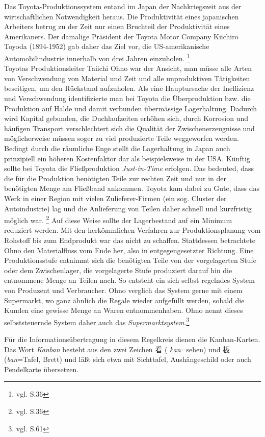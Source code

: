 Das Toyota-Produktionssystem entand im Japan der Nachkriegszeit 
aus der wirtschaftlichen Notwendigkeit heraus. 
Die Produktivität eines japanischen Arbeiters betrug zu der Zeit nur einen Bruchteil der Produktivität eines Amerikaners. 
Der damalige Präsident der Toyota Motor Company Kiichiro Toyoda (1894-1952) gab daher das Ziel vor, 
die US-amerikanische Automobilindustrie innerhalb von drei Jahren  einzuholen. \footnote{vgl. \cite{Ohno2013TPS} S.36}\\
Toyotas Produktionsleiter Taiichi Ohno war der Ansicht, man müsse alle Arten von 
Verschwendung von Material und Zeit und alle unproduktiven Tätigkeiten 
beseitigen, um den Rückstand aufzuholen. Als eine Hauptursache der Ineffizienz 
und Verschwendung identifizierte man bei Toyota die Überproduktion bzw. die Produktion auf 
Halde und damit verbunden übermässige Lagerhaltung. Dadurch wird Kapital gebunden, 
die Duchlaufzeiten erhöhen sich, durch Korrosion und häufigen Transport verschlechtert
sich die Qualität der Zwischenerzeugnisse und möglicherweise müssen soger zu viel
produzierte Teile weggeworfen werden. Bedingt durch die räumliche Enge stellt die 
Lagerhaltung in Japan auch prinzipiell ein höheren Kostenfaktor dar als beispielsweise in der USA.
Künftig sollte bei Toyota die Fließproduktion \emph{Just-in-Time} erfolgen. 
Das bedeuted, dass die für die Produktion benötigten Teile zur rechten Zeit und 
nur in der benötigten Menge am Fließband ankommen.
Toyota kam dabei zu Gute, dass das Werk in einer Region mit vielen Zulieferer-Firmen (ein sog. Cluster der Autoindustrie)
lag und die Anlieferung von Teilen daher schnell und kurzfristig möglich war. \footnote{vgl. \cite{Economist2009Ohno} S.36}
Auf diese Weise sollte der Lagerbestand auf ein Minimum reduziert werden.
Mit den herkömmlichen Verfahren zur Produktionsplanung vom Rohstoff 
bis zum Endprodukt war das nicht zu schaffen.
Stattdessen betrachtete Ohno den Materialfluss vom Ende her, also in entgegengesetzter Richtung.
Eine Produktionsstufe entnimmt sich die benötigten Teile von der vorgelagerten Stufe oder dem Zwischenlager,
die vorgelagerte Stufe produziert darauf hin die entnommene Menge an Teilen nach.
So entsteht ein sich selbst regelndes System von Produzent und Verbraucher.
Ohno verglich das System gerne mit einem Supermarkt, wo ganz ähnlich die Regale wieder aufgefüllt werden, 
sobald die Kunden eine gewisse Menge an Waren entnommenhaben. 
Ohno nennt dieses selbststeuernde System daher auch das \emph{Supermarktsystem}.\footnote{vgl. \cite{Ohno2013TPS} S.61}

Für die Informationsübertragung in diesem Regelkreis dienen die Kanban-Karten.
Das Wort \emph{Kanban} besteht aus den zwei Zeichen {\CN 看} ( \emph{kan}=sehen)
 und {\CN 板} (\emph{ban}=Tafel, Brett) und läßt sich etwa mit Sichttafel, 
 Aushängeschild oder auch Pendelkarte übersetzen.

